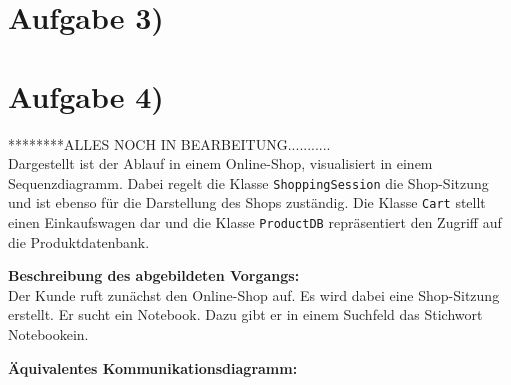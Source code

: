 \documentclass{swp1}
\begin{document}
\section*{Aufgabe 3)}
\section*{Aufgabe 4)}

********ALLES NOCH IN BEARBEITUNG...........\\

Dargestellt ist der Ablauf in einem Online-Shop, visualisiert in einem Sequenzdiagramm. Dabei regelt die Klasse \texttt{ShoppingSession} die Shop-Sitzung und ist ebenso für die Darstellung des Shops zuständig. Die Klasse \texttt{Cart} stellt einen Einkaufswagen dar und die Klasse \texttt{ProductDB} repräsentiert den Zugriff auf die Produktdatenbank.

\textbf{Beschreibung des abgebildeten Vorgangs:}\\
Der Kunde ruft zunächst den Online-Shop auf. Es wird dabei eine Shop-Sitzung erstellt. Er sucht ein Notebook. Dazu gibt er in einem Suchfeld das Stichwort \glqq Notebook\grqq ein. 

\textbf{Äquivalentes Kommunikationsdiagramm:}\\
\end{document}
